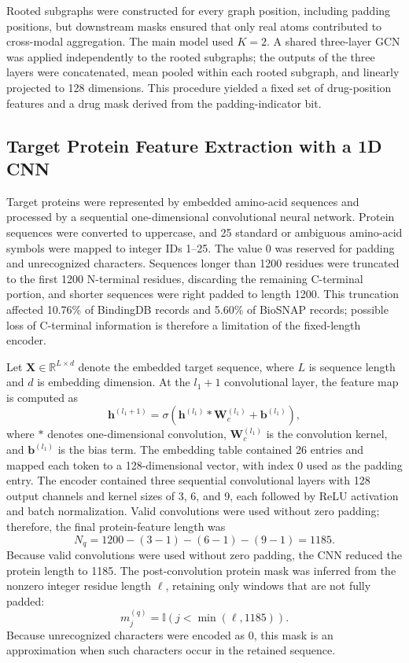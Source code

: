 \documentclass[computers,article,submit,moreauthors]{Definitions/mdpi}
\begin{document}
Rooted subgraphs were constructed for every graph position, including padding positions, but downstream masks ensured that only real atoms contributed to cross-modal aggregation. The main model used $K=2$. A shared three-layer GCN was applied independently to the rooted subgraphs; the outputs of the three layers were concatenated, mean pooled within each rooted subgraph, and linearly projected to 128 dimensions. This procedure yielded a fixed set of drug-position features and a drug mask derived from the padding-indicator bit.

\subsection{Target Protein Feature Extraction with a 1D CNN}
Target proteins were represented by embedded amino-acid sequences and processed by a sequential one-dimensional convolutional neural network. Protein sequences were converted to uppercase, and 25 standard or ambiguous amino-acid symbols were mapped to integer IDs 1--25. The value 0 was reserved for padding and unrecognized characters. Sequences longer than 1200 residues were truncated to the first 1200 N-terminal residues, discarding the remaining C-terminal portion, and shorter sequences were right padded to length 1200. This truncation affected 10.76\% of BindingDB records and 5.60\% of BioSNAP records; possible loss of C-terminal information is therefore a limitation of the fixed-length encoder.

Let $\mathbf{X} \in \mathbb{R}^{L \times d}$ denote the embedded target sequence, where $L$ is sequence length and $d$ is embedding dimension. At the $l_1 + 1$ convolutional layer, the feature map is computed as
\begin{equation}
\mathbf{h}^{(l_1+1)} = \sigma \left( \mathbf{h}^{(l_1)} * \mathbf{W}_c^{(l_1)} + \mathbf{b}^{(l_1)} \right),
\end{equation}
where $*$ denotes one-dimensional convolution, $\mathbf{W}_c^{(l_1)}$ is the convolution kernel, and $\mathbf{b}^{(l_1)}$ is the bias term. The embedding table contained 26 entries and mapped each token to a 128-dimensional vector, with index 0 used as the padding entry. The encoder contained three sequential convolutional layers with 128 output channels and kernel sizes of 3, 6, and 9, each followed by ReLU activation and batch normalization. Valid convolutions were used without zero padding; therefore, the final protein-feature length was
\begin{equation}
N_q = 1200 - (3-1) - (6-1) - (9-1) = 1185.
\end{equation}
Because valid convolutions were used without zero padding, the CNN reduced the protein length to 1185. The post-convolution protein mask was inferred from the nonzero integer residue length $\ell$, retaining only windows that are not fully padded:
\begin{equation}
m_j^{(q)} = \mathbb{I}\left(j < \min(\ell,1185)\right).
\end{equation}
Because unrecognized characters were encoded as 0, this mask is an approximation when such characters occur in the retained sequence.
\end{document}
